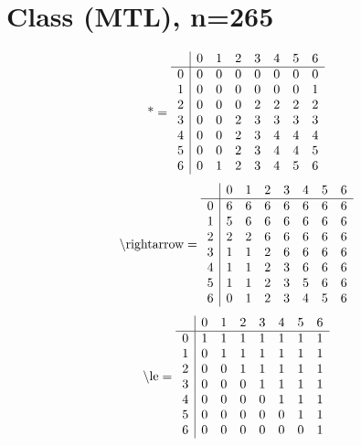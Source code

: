 \documentclass[11pt]{article}
\begin{document}
\section{Class (MTL), n=265}
\[\text{*} = 
\begin{array}{r | r r r r r r r}
 & 0 & 1 & 2 & 3 & 4 & 5 & 6 \\ \hline
0 & 0 & 0 & 0 & 0 & 0 & 0 & 0 \\
1 & 0 & 0 & 0 & 0 & 0 & 0 & 1 \\
2 & 0 & 0 & 0 & 2 & 2 & 2 & 2 \\
3 & 0 & 0 & 2 & 3 & 3 & 3 & 3 \\
4 & 0 & 0 & 2 & 3 & 4 & 4 & 4 \\
5 & 0 & 0 & 2 & 3 & 4 & 4 & 5 \\
6 & 0 & 1 & 2 & 3 & 4 & 5 & 6 \\
\end{array}
\]
\[\text{\textbackslash rightarrow} = 
\begin{array}{r | r r r r r r r}
 & 0 & 1 & 2 & 3 & 4 & 5 & 6 \\ \hline
0 & 6 & 6 & 6 & 6 & 6 & 6 & 6 \\
1 & 5 & 6 & 6 & 6 & 6 & 6 & 6 \\
2 & 2 & 2 & 6 & 6 & 6 & 6 & 6 \\
3 & 1 & 1 & 2 & 6 & 6 & 6 & 6 \\
4 & 1 & 1 & 2 & 3 & 6 & 6 & 6 \\
5 & 1 & 1 & 2 & 3 & 5 & 6 & 6 \\
6 & 0 & 1 & 2 & 3 & 4 & 5 & 6 \\
\end{array}
\]
\[\text{\textbackslash le} = 
\begin{array}{r | r r r r r r r}
 & 0 & 1 & 2 & 3 & 4 & 5 & 6 \\ \hline
0 & 1 & 1 & 1 & 1 & 1 & 1 & 1 \\
1 & 0 & 1 & 1 & 1 & 1 & 1 & 1 \\
2 & 0 & 0 & 1 & 1 & 1 & 1 & 1 \\
3 & 0 & 0 & 0 & 1 & 1 & 1 & 1 \\
4 & 0 & 0 & 0 & 0 & 1 & 1 & 1 \\
5 & 0 & 0 & 0 & 0 & 0 & 1 & 1 \\
6 & 0 & 0 & 0 & 0 & 0 & 0 & 1 \\
\end{array}
\]
\end{document}
